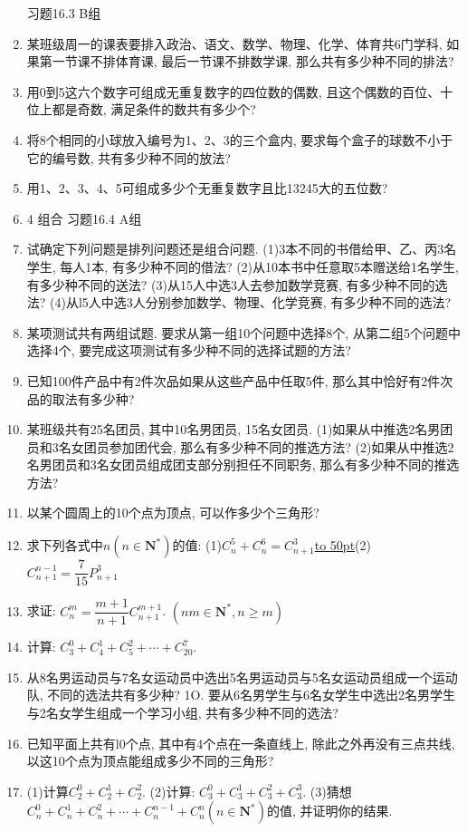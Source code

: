 \documentclass[10pt,a4paper]{article}
\newcommand{\blank}[1]{\underline{\hbox to #1pt{}}}
\begin{document}
\begin{enumerate}[1.]
习题16.3 B组
\item 某班级周一的课表要排入政治、语文、数学、物理、化学、体育共6门学科, 如果第一节课不排体育课, 最后一节课不排数学课, 那么共有多少种不同的排法?
\item 用0到5这六个数字可组成无重复数字的四位数的偶数, 且这个偶数的百位、十位上都是奇数, 满足条件的数共有多少个?
\item 将8个相同的小球放入编号为1、2、3的三个盒内, 要求每个盒子的球数不小于它的编号数, 共有多少种不同的放法?
\item 用1、2、3、4、5可组成多少个无重复数字且比13245大的五位数?
\item 4  组合
习题16.4  A组
\item 试确定下列问题是排列问题还是组合问题.
(1)3本不同的书借给甲、乙、丙3名学生, 每人1本, 有多少种不同的借法?
(2)从10本书中任意取5本赠送给1名学生, 有多少种不同的送法?
(3)从15人中选3人去参加数学竞赛, 有多少种不同的选法?
(4)从l5人中选3人分别参加数学、物理、化学竞赛, 有多少种不同的选法?
\item 某项测试共有两组试题. 要求从第一组10个问题中选择8个, 从第二组5个问题中选择4个, 要完成这项测试有多少种不同的选择试题的方法?
\item 已知100件产品中有2件次品如果从这些产品中任取5件, 那么其中恰好有2件次品的取法有多少种?
\item 某班级共有25名团员, 其中10名男团员, 15名女团员.
(1)如果从中推选2名男团员和3名女团员参加团代会, 那么有多少种不同的推选方法?
(2)如果从中推选2名男团员和3名女团员组成团支部分别担任不同职务, 那么有多少种不同的推选方法?
\item 以某个圆周上的10个点为顶点, 可以作多少个三角形?
\item 求下列各式中$n(n\in \mathbf{N}^*)$的值:
(1)$C_n^5+C_n^6=C_{n+1}^3$\blank{50}(2)$C_{n+1}^{n-1}=\dfrac 7{15}P_{n+1}^3$
\item 求证: $C_n^m=\dfrac{m+1}{n+1}C_{n+1}^{m+1}$. $(nm\in \mathbf{N}^*,n\ge m)$
\item 计算: $C_3^0+C_4^1+C_5^2+\cdots +C_{20}^7$.
\item 从8名男运动员与7名女运动员中选出5名男运动员与5名女运动员组成一个运动队, 不同的选法共有多少种?
1O. 要从6名男学生与6名女学生中选出2名男学生与2名女学生组成一个学习小组, 共有多少种不同的选法?
\item 已知平面上共有l0个点, 其中有4个点在一条直线上, 除此之外再没有三点共线, 以这10个点为顶点能组成多少不同的三角形?
\item (1)计算$C_2^0+C_2^1+C_2^2$.
(2)计算: $C_3^0+C_3^1+C_3^2+C_3^3$.
(3)猜想$C_n^0+C_n^1+C_n^2+\cdots +C_n^{n-1}+C_n^n(n\in \mathbf{N}^*)$的值, 并证明你的结果.

\end{enumerate}
\end{document}
